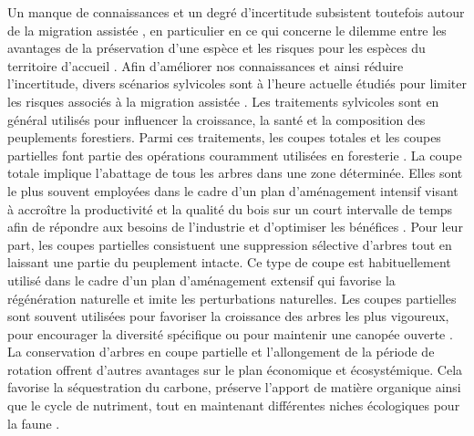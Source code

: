 Un manque de connaissances et un degré d'incertitude subsistent toutefois autour de la migration assistée \citep{Klenk2015assistedmigration,Park2018Informationunderload}, 
en particulier en ce qui concerne le dilemme entre les avantages de la préservation d'une espèce et les risques pour les espèces du territoire d'accueil \citep{McLachlan2007frameworkdebate,Vitt2010Assistedmigration,Hewitt2011Takingstock}.
Afin d'améliorer nos connaissances et ainsi réduire l'incertitude, divers scénarios sylvicoles sont à l'heure actuelle étudiés pour limiter les risques associés à la migration assistée \citep{royoDesiredREgenerationAssisted2023}.
Les traitements sylvicoles sont en général utilisés pour influencer la croissance, la santé et la composition des peuplements forestiers.
Parmi ces traitements, les coupes totales et les coupes partielles font partie des opérations couramment utilisées en foresterie \citep{Man2008Elevenyearresponses,Chaudhary2016Impactforest,MontoroGirona2018ConiferRegeneration,Ameray2021Forestcarbon}. 
La coupe totale implique l'abattage de tous les arbres dans une zone déterminée.
Elles sont le plus souvent employées dans le cadre d'un plan d'aménagement intensif visant à accroître la productivité et la qualité du bois 
sur un court intervalle de temps afin de répondre aux besoins de l'industrie et d'optimiser les bénéfices \citep{Ameray2021Forestcarbon}.
Pour leur part, les coupes partielles consistuent une suppression sélective d'arbres tout en laissant une partie du peuplement intacte.
Ce type de coupe est habituellement utilisé dans le cadre d'un plan d'aménagement extensif qui favorise la régénération naturelle et imite les perturbations naturelles.
Les coupes partielles sont souvent utilisées pour favoriser la croissance des arbres les plus vigoureux, pour encourager la diversité spécifique ou pour maintenir une canopée ouverte \citep{Irland2011Timberproductivity,Ameray2021Forestcarbon}.
La conservation d'arbres en coupe partielle et l'allongement de la période de rotation offrent d'autres avantages sur le plan économique et écosystémique. 
Cela favorise la séquestration du carbone, préserve l'apport de matière organique ainsi que le cycle de nutriment, 
tout en maintenant différentes niches écologiques pour la faune \citep{Barg1999Influencepartial,Tong2020Forestmanagement,Ameray2021Forestcarbon}.

